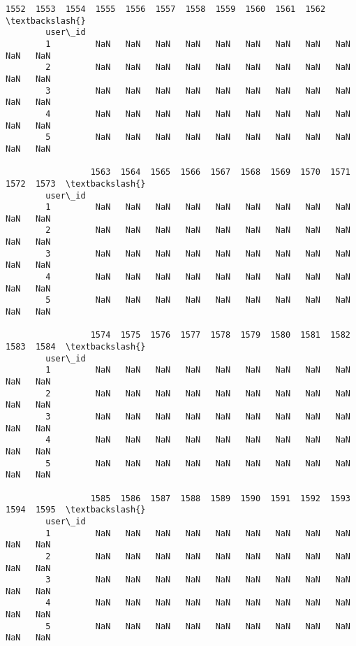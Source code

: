 \documentclass[11pt]{article}
\begin{document}
\begin{Verbatim}[commandchars=\\\{\}]
                 1552  1553  1554  1555  1556  1557  1558  1559  1560  1561  1562  \textbackslash{}
        user\_id                                                                     
        1         NaN   NaN   NaN   NaN   NaN   NaN   NaN   NaN   NaN   NaN   NaN   
        2         NaN   NaN   NaN   NaN   NaN   NaN   NaN   NaN   NaN   NaN   NaN   
        3         NaN   NaN   NaN   NaN   NaN   NaN   NaN   NaN   NaN   NaN   NaN   
        4         NaN   NaN   NaN   NaN   NaN   NaN   NaN   NaN   NaN   NaN   NaN   
        5         NaN   NaN   NaN   NaN   NaN   NaN   NaN   NaN   NaN   NaN   NaN   
        
                 1563  1564  1565  1566  1567  1568  1569  1570  1571  1572  1573  \textbackslash{}
        user\_id                                                                     
        1         NaN   NaN   NaN   NaN   NaN   NaN   NaN   NaN   NaN   NaN   NaN   
        2         NaN   NaN   NaN   NaN   NaN   NaN   NaN   NaN   NaN   NaN   NaN   
        3         NaN   NaN   NaN   NaN   NaN   NaN   NaN   NaN   NaN   NaN   NaN   
        4         NaN   NaN   NaN   NaN   NaN   NaN   NaN   NaN   NaN   NaN   NaN   
        5         NaN   NaN   NaN   NaN   NaN   NaN   NaN   NaN   NaN   NaN   NaN   
        
                 1574  1575  1576  1577  1578  1579  1580  1581  1582  1583  1584  \textbackslash{}
        user\_id                                                                     
        1         NaN   NaN   NaN   NaN   NaN   NaN   NaN   NaN   NaN   NaN   NaN   
        2         NaN   NaN   NaN   NaN   NaN   NaN   NaN   NaN   NaN   NaN   NaN   
        3         NaN   NaN   NaN   NaN   NaN   NaN   NaN   NaN   NaN   NaN   NaN   
        4         NaN   NaN   NaN   NaN   NaN   NaN   NaN   NaN   NaN   NaN   NaN   
        5         NaN   NaN   NaN   NaN   NaN   NaN   NaN   NaN   NaN   NaN   NaN   
        
                 1585  1586  1587  1588  1589  1590  1591  1592  1593  1594  1595  \textbackslash{}
        user\_id                                                                     
        1         NaN   NaN   NaN   NaN   NaN   NaN   NaN   NaN   NaN   NaN   NaN   
        2         NaN   NaN   NaN   NaN   NaN   NaN   NaN   NaN   NaN   NaN   NaN   
        3         NaN   NaN   NaN   NaN   NaN   NaN   NaN   NaN   NaN   NaN   NaN   
        4         NaN   NaN   NaN   NaN   NaN   NaN   NaN   NaN   NaN   NaN   NaN   
        5         NaN   NaN   NaN   NaN   NaN   NaN   NaN   NaN   NaN   NaN   NaN   
        

\end{Verbatim}
\end{document}
